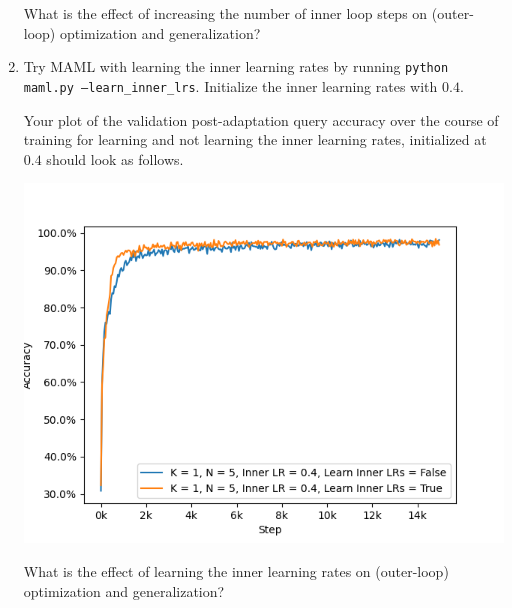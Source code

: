 \begin{enumerate}[label=(\roman*)]
    What is the effect of increasing the number of inner loop steps on (outer-loop) optimization and generalization?

    \item Try MAML with learning the inner learning rates by running \texttt{python maml.py --learn\_inner\_lrs}. Initialize the inner learning rates with $0.4$.

    Your plot of the validation post-adaptation query accuracy over the course of training for learning and not learning the inner learning rates, initialized at $0.4$ should look as follows.
    \begin{center}
        \includegraphics[width=0.75\linewidth]{./figures/maml_q5}
    \end{center}

    What is the effect of learning the inner learning rates on (outer-loop) optimization and generalization?
\end{enumerate}